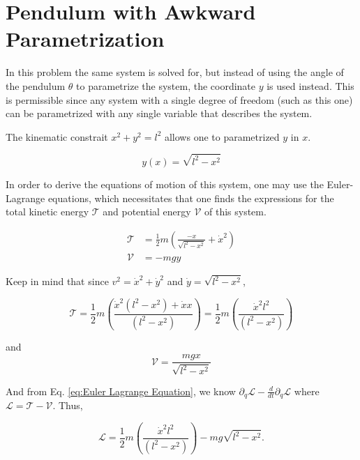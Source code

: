 \section{Pendulum with Awkward Parametrization}
In this problem the same system is solved for, but instead of using the angle of the pendulum $\theta$ to parametrize the system, the coordinate $y$ is used instead. This is permissible since any system with a single degree of freedom (such as this one) can be parametrized with any single variable that describes the system.

The kinematic constrait $x^2 + y^2 = l^2$ allows one to parametrized $y$ in $x$.

\begin{equation}
    y(x) = \sqrt{l^2 - x^2}
\end{equation}

In order to derive the equations of motion of this system, one may use the Euler-Lagrange equations, which necessitates that one finds the expressions for the  total kinetic energy $\mathcal{T}$ and potential energy $\mathcal{V}$ of this system.

\begin{align}
    \mathcal{T} &= \frac{1}{2}m
            \left( 
                \frac{-x}{\sqrt{l^2 - x^2}}
                + \dot{x}^2
            \right) \\
    \mathcal{V} &= -mgy
\end{align}

Keep in mind that since $v^2 = \dot{x}^2 + \dot{y}^2$ and $\dot{y} = \sqrt{l^2 - x^2}$,

\begin{equation}
    \mathcal{T} =
    \frac{1}{2}m \left( \frac{\dot{x}^2 \left(l^2 - x^2\right) + \dot{x}x}{\left(l^2 - x^2 \right)} \right) =
    \frac{1}{2}m \left(\frac{\dot{x}^2l^2}{\left(l^2 - x^2 \right)} \right)
\end{equation}

and
\begin{equation}
    \mathcal{V} = \frac{mgx}{\sqrt{l^2 - x^2}}
\end{equation}

And from Eq. \ref{eq:Euler Lagrange Equation}, we know $\partial_q\mathcal{L} - \frac{d}{dt}\partial_{\dot{q}}\mathcal{L}$ where $\mathcal{L} = \mathcal{T} - \mathcal{V}$. Thus,

\begin{equation}
    \mathcal{L} = 
    \frac{1}{2}m \left(\frac{\dot{x}^2l^2}{\left(l^2 - x^2 \right)} \right) - mg\sqrt{l^2 - x^2}.
\end{equation}


